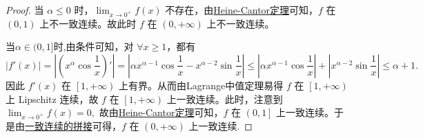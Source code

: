 \documentclass[../../main.tex]{subfiles}%
\begin{document}
\begin{proof}

当 $\alpha \leqslant 0$ 时，$\lim_{x \rightarrow 0^+} f\left( x \right)$ 不存在，由\hyperref[theroem:Heine-Cantor定理]{Heine-Cantor定理}可知，$f$ 在 $\left( 0,1 \right)$ 上不一致连续。故此时 $f$ 在 $\left( 0,+\infty \right)$ 上不一致连续。

当$\alpha \in (0,1]$时,由条件可知，对 $\forall x \geqslant 1$，都有
\[
\left| f'\left( x \right) \right| = \left| \left( x^{\alpha} \cos \frac{1}{x} \right)' \right| = \left| \alpha x^{\alpha - 1} \cos \frac{1}{x} - x^{\alpha - 2} \sin \frac{1}{x} \right| \leqslant \left| \alpha x^{\alpha - 1} \cos \frac{1}{x} \right| + \left| x^{\alpha - 2} \sin \frac{1}{x} \right| \leqslant \alpha + 1.
\]
因此 $f'\left( x \right)$ 在 $\left[ 1, +\infty \right)$ 上有界。从而由Lagrange中值定理易得 $f$ 在 $\left[ 1,+\infty \right)$ 上 Lipschitz 连续，故 $f$ 在 $\left[ 1,+\infty \right)$ 上一致连续。此时，注意到
\(
\lim_{x \rightarrow 0^+} f\left( x \right) = 0,
\)
故由\hyperref[theroem:Heine-Cantor定理]{Heine-Cantor定理}可知，$f$ 在 $\left( 0,1 \right]$ 上一致连续。于是由\hyperref[proposition:一致连续函数的拼接]{一致连续的拼接}可得，$f$ 在 $\left( 0,+\infty \right)$ 上一致连续.


\end{proof}
\end{document}
